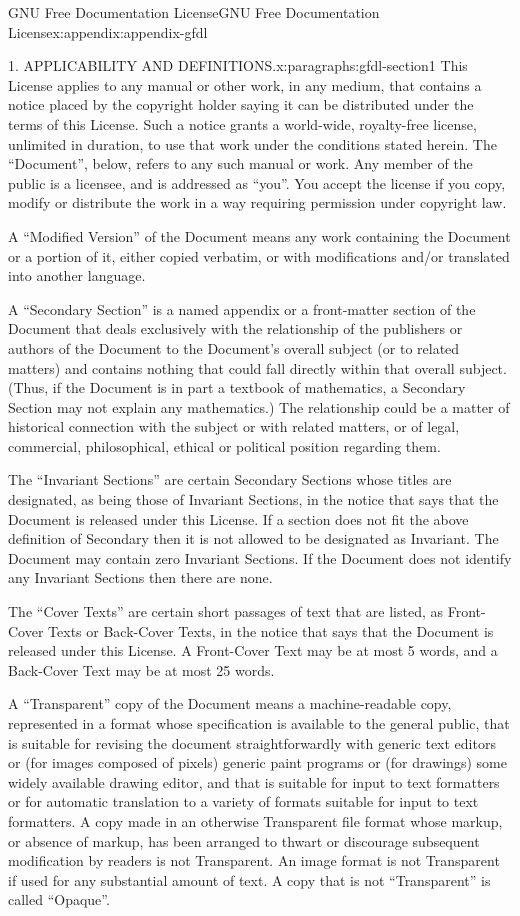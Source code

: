 \documentclass[twoside,10pt,]{book}
\numberwithin{equation}{part}
\begin{document}
\begin{appendixptx}{GNU Free Documentation License}{}{GNU Free Documentation License}{}{}{x:appendix:appendix-gfdl}
\begin{paragraphs}{1. APPLICABILITY AND DEFINITIONS.}{x:paragraphs:gfdl-section1}
This License applies to any manual or other work, in any medium, that contains a notice placed by the copyright holder saying it can be distributed under the terms of this License. Such a notice grants a world-wide, royalty-free license, unlimited in duration, to use that work under the conditions stated herein. The ``Document'', below, refers to any such manual or work. Any member of the public is a licensee, and is addressed as ``you''. You accept the license if you copy, modify or distribute the work in a way requiring permission under copyright law.%
\par
A ``Modified Version'' of the Document means any work containing the Document or a portion of it, either copied verbatim, or with modifications and\slash{}or translated into another language.%
\par
A ``Secondary Section'' is a named appendix or a front-matter section of the Document that deals exclusively with the relationship of the publishers or authors of the Document to the Document's overall subject (or to related matters) and contains nothing that could fall directly within that overall subject. (Thus, if the Document is in part a textbook of mathematics, a Secondary Section may not explain any mathematics.) The relationship could be a matter of historical connection with the subject or with related matters, or of legal, commercial, philosophical, ethical or political position regarding them.%
\par
The ``Invariant Sections'' are certain Secondary Sections whose titles are designated, as being those of Invariant Sections, in the notice that says that the Document is released under this License. If a section does not fit the above definition of Secondary then it is not allowed to be designated as Invariant. The Document may contain zero Invariant Sections. If the Document does not identify any Invariant Sections then there are none.%
\par
The ``Cover Texts'' are certain short passages of text that are listed, as Front-Cover Texts or Back-Cover Texts, in the notice that says that the Document is released under this License. A Front-Cover Text may be at most 5 words, and a Back-Cover Text may be at most 25 words.%
\par
A ``Transparent'' copy of the Document means a machine-readable copy, represented in a format whose specification is available to the general public, that is suitable for revising the document straightforwardly with generic text editors or (for images composed of pixels) generic paint programs or (for drawings) some widely available drawing editor, and that is suitable for input to text formatters or for automatic translation to a variety of formats suitable for input to text formatters. A copy made in an otherwise Transparent file format whose markup, or absence of markup, has been arranged to thwart or discourage subsequent modification by readers is not Transparent. An image format is not Transparent if used for any substantial amount of text. A copy that is not ``Transparent'' is called ``Opaque''.%

\end{paragraphs}
\end{appendixptx}
\end{document}
